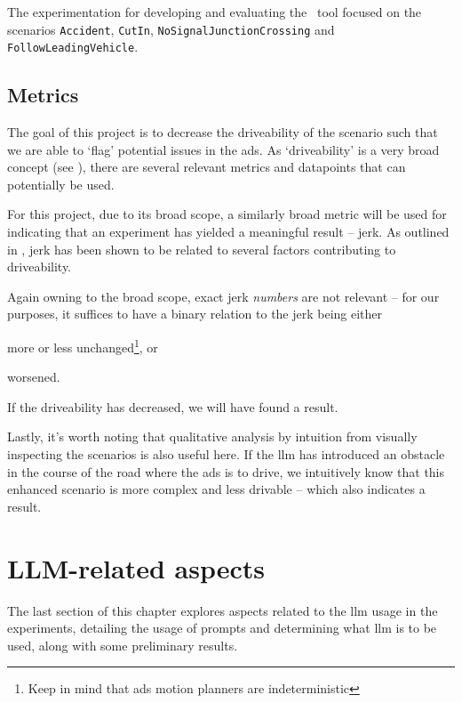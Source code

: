 The experimentation for developing and evaluating the \hefe~tool focused on the
scenarios \texttt{Accident}, \texttt{CutIn}, \texttt{NoSignalJunctionCrossing}
and \texttt{FollowLeadingVehicle}.


\subsection{Metrics}\label{sec:experimentsMetrics}

The goal of this project is to decrease the driveability of the scenario such that we are able to
`flag' potential issues in the \acrshort{ads}. As `driveability' is a very broad concept (see
), there are several relevant metrics and datapoints that can potentially
be used.

For this project, due to its broad scope, a similarly broad metric will be used for indicating that
an experiment has yielded a meaningful result -- jerk. As outlined in , jerk
has been shown to be related to several factors contributing to driveability.

Again owning to the broad scope, exact jerk \emph{numbers} are not relevant -- for our purposes, it
suffices to have a binary relation to the jerk being either \begin{inparaenum}
    \item more or less unchanged\footnote{Keep in mind that \acrshort{ads} motion planners are
        indeterministic}, or
    \item worsened.
\end{inparaenum} If the driveability has decreased, we will have found a result.

Lastly, it's worth noting that qualitative analysis by intuition from visually inspecting the
scenarios is also useful here. If the \acrshort{llm} has introduced an obstacle in the course of the
road where the \acrshort{ads} is to drive, we intuitively know that this enhanced scenario is more
complex and less drivable -- which also indicates a result.


\section{LLM-related aspects}

The last section of this chapter explores aspects related to the \acrshort{llm}
usage in the experiments, detailing the usage of prompts and determining what
\acrshort{llm} is to be used, along with some preliminary results.

